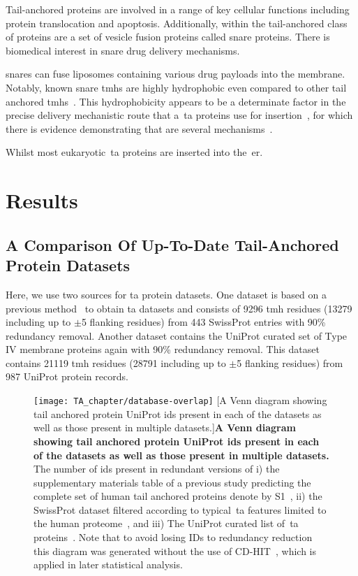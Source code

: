 Tail-anchored proteins are involved in a range of key cellular functions including protein translocation and apoptosis.
Additionally, within the tail-anchored class of proteins are a set of vesicle fusion proteins called \gls{snare} proteins.
There is biomedical interest in \gls{snare} drug delivery mechanisms.

\gls{snare}s can fuse liposomes containing various drug payloads into the membrane.
Notably, known \gls{snare} \gls{tmh}s are highly hydrophobic even compared to other tail anchored \gls{tmh}s~\cite{Kalbfleisch2007}.
This hydrophobicity appears to be a determinate factor in the precise delivery mechanistic route that a~\gls{ta} proteins use for insertion~\cite{Rabu2008, Rabu2009}, for which there is evidence demonstrating that are several mechanisms~\cite{Rabu2009, Johnson2013}.

Whilst most eukaryotic~\gls{ta} proteins are inserted into the~\gls{er}.

\section{Results}

\subsection{A Comparison Of Up-To-Date Tail-Anchored Protein Datasets}
Here, we use two sources for \gls{ta} protein datasets.
One dataset is based on a previous method~\cite{Kalbfleisch2007} to obtain \gls{ta} datasets and consists of 9296 \gls{tmh} residues (13279 including up to $\pm$5 flanking residues) from 443 SwissProt entries with 90\% redundancy removal.
Another dataset contains the UniProt curated set of Type IV membrane proteins again with 90\% redundancy removal.
This dataset contains 21119 \gls{tmh} residues (28791 including up to $\pm$5 flanking residues) from 987 UniProt protein records.

\begin{figure}[!ht]
\centering
\texttt{[image: TA\_chapter/database-overlap]}
		[A Venn diagram showing tail anchored protein UniProt ids present in each of the datasets as well as those present in multiple datasets.]{\textbf{A Venn diagram showing tail anchored protein UniProt ids present in each of the datasets as well as those present in multiple datasets.}
The number of ids present in redundant versions of
i) the supplementary materials table of a previous study predicting the complete set of human tail anchored proteins denote by S1~\cite{Kalbfleisch2007},
ii) the SwissProt dataset filtered according to typical~\gls{ta} features limited to the human proteome~\cite{TheUniProtConsortium2014}, and
iii) The UniProt curated list of~\gls{ta} proteins~\cite{TheUniProtConsortium2014}.
Note that to avoid losing IDs to redundancy reduction this diagram was generated without the use of CD-HIT~\cite{Huang2010, Wu2011}, which is applied in later statistical analysis.}

\label{fig:tadatasetoverlap}
\end{figure}


